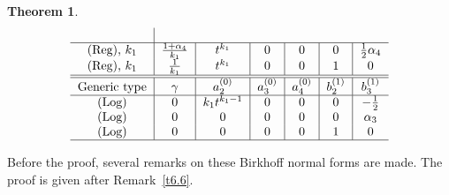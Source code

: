 \documentclass[pdftex]{sigma}%
\numberwithin{equation}{section}
\numberwithin{figure}{section}
\newtheorem{Theorem}{Theorem}[section]
\begin{document}
\begin{Theorem}
\[\begin{tabular}{c|c|c|c|c|c|c}
\\
\hline
$($Reg$)$, $k_1$ & $\frac{1+\alpha_4}{k_1}$ & $t^{k_1}$ & $0$ &
$0$ & $0$ & $\frac{1}{2}\alpha_4$
\\
$($Reg$)$, $k_1$ & $\frac{1}{k_1}$ & $t^{k_1}$ & $0$ & $0$ & $1$ & $0$
\\ \hline \hline
Generic type & $\gamma$
& $a_2^{(0)}$ & $a_3^{(0)}$ & $a_4^{(0)}$ &
$b_2^{(1)}$ & $b_3^{(1)}$
\\ \hline
$($Log$)$ & $0$ & $k_1t^{k_1-1}$ & $0$ & $0$ & $0$ & $-\frac{1}{2}$
\\
$($Log$)$ & $0$ & $0$ & $0$ & $0$ & $0$ & $\alpha_3$
\\
$($Log$)$ & $0$ & $0$ & $0$ & $0$ & $1$ & $0$
\\
\hline
\end{tabular}
\]
\end{Theorem}

Before the proof, several remarks on these Birkhoff
normal forms are made.
The proof is given after Remark~\ref{t6.6}.
\end{document}
